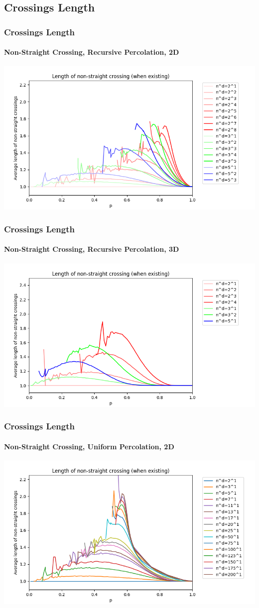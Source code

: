 \documentclass{beamer}
\begin{document}
	\subsection{Crossings Length}
	\begin{frame}
		\frametitle{Crossings Length}
		\framesubtitle{Non-Straight Crossing, Recursive Percolation, 2D}
		\begin{center}
			\includegraphics[scale=0.5]{imgs/crossing_length_2D.png}
		\end{center}
	\end{frame}
	\begin{frame}
		\frametitle{Crossings Length}
		\framesubtitle{Non-Straight Crossing, Recursive Percolation, 3D}
		\includegraphics[scale=0.5]{imgs/crossing_length_3D.png}
	\end{frame}
	\begin{frame}
		\frametitle{Crossings Length}
		\framesubtitle{Non-Straight Crossing, Uniform Percolation, 2D}
		\includegraphics[scale=0.5]{imgs/crossing_length_2D_ter.png}
	\end{frame}
\end{document}

